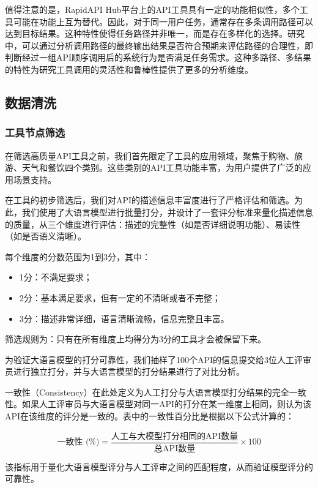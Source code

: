 值得注意的是，RapidAPI Hub平台上的API工具具有一定的功能相似性，多个工具可能在功能上互为替代。因此，对于同一用户任务，通常存在多条调用路径可以达到目标结果。这种特性使得任务路径并非唯一，而是存在多样化的选择。研究中，可以通过分析调用路径的最终输出结果是否符合预期来评估路径的合理性，即判断经过一组API顺序调用后的系统行为是否满足任务需求。这种多路径、多结果的特性为研究工具调用的灵活性和鲁棒性提供了更多的分析维度。

\subsection{数据清洗}

\subsubsection{工具节点筛选}

在筛选高质量API工具之前，我们首先限定了工具的应用领域，聚焦于购物、旅游、天气和餐饮四个类别。这些类别的API工具功能丰富，为用户提供了广泛的应用场景支持。

在工具的初步筛选后，我们对API的描述信息丰富度进行了严格评估和筛选。为此，我们使用了大语言模型进行批量打分，并设计了一套评分标准来量化描述信息的质量，从三个维度进行评估：描述的完整性（如是否详细说明功能）、易读性（如是否语义清晰）。

每个维度的分数范围为1到3分，其中：
\begin{itemize}
    \item 1分：不满足要求；
    \item 2分：基本满足要求，但有一定的不清晰或者不完整；
    \item 3分：描述非常详细，语言清晰流畅，信息完整且丰富。
\end{itemize}

筛选规则为：只有在所有维度上均得分为3分的工具才会被保留下来。

为验证大语言模型的打分可靠性，我们抽样了100个API的信息提交给3位人工评审员进行独立打分，并与大语言模型的打分结果进行了对比分析。

一致性（Consistency）在此处定义为人工打分与大语言模型打分结果的完全一致性。如果人工评审员与大语言模型对同一API的打分在某一维度上相同，则认为该API在该维度的评分是一致的。表中的一致性百分比是根据以下公式计算的：

\[
\text{一致性 (\%)} = \frac{\text{人工与大模型打分相同的API数量}}{\text{总API数量}} \times 100
\]

该指标用于量化大语言模型评分与人工评审之间的匹配程度，从而验证模型评分的可靠性。

